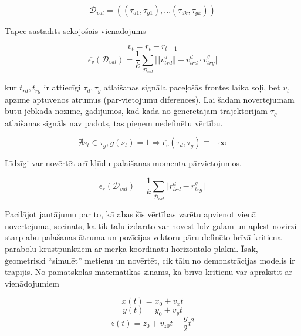 \documentclass[12pt, a4paper]{article}
\numberwithin{equation}{section} %
\begin{document}
\begin{equation}
    \mathcal{D}_{val} = \left (  (\tau_{d1}, \tau_{g1}), ...
     (\tau_{dk}, \tau_{gk}) \right )
\end{equation}

Tāpēc sastādīts sekojošais vienādojums

\begin{equation}
    v_t = r_t - r_{t-1}
\end{equation}
\begin{equation}
    \overline{\epsilon_v}(\mathcal{D}_{val}) = \frac{1}{k} \sum_{\mathcal{D}_{val}}
    \vert \Vert v^d_{trd} \Vert - v^d_{trd} \cdot v^g_{trg} \vert 
\end{equation}

kur $t_{rd}, t_{rg}$ ir attiecīgi $\tau_{d}, \tau_{g}$ atlaišanas signāla paceļošās frontes laika soļi, bet $v_t$ apzīmē aptuvenos ātrumus (pār-vietojumu diferences). Lai šādam novērtējumam būtu jebkāda nozīme, gadījumos, kad kādā no ģenerētajām trajektorijām $\tau_{g}$ atlaišanas signāls nav padots, tas pieņem nedefinētu vērtību.

\begin{equation}
    \nexists s_t \in \tau_{g}, g(s_t) = 1 
    \Rightarrow
    \overline{\epsilon_v}(\tau_{d},\tau_{g}) \equiv +\infty 
\end{equation}

Līdzīgi var novērtēt arī kļūdu palaišanas momenta pārvietojumos.

\begin{equation}
    \overline{\epsilon_r}(\mathcal{D}_{val}) = \frac{1}{k} \sum_{\mathcal{D}_{val}}
    \Vert r^d_{trd} - r^g_{trg} \Vert 
\end{equation}

Pacilājot jautājumu par to, kā abas šīs vērtības varētu apvienot vienā novērtējumā, secināts, ka tik tālu izdarīto var novest līdz galam un aplēst novirzi starp abu palašanas ātruma un pozīcijas vektoru pāru definēto brīvā kritiena parabolu krustpunktiem ar mērķa koordinātu horizontālo plakni. Īsāk, ģeometriski ``simulēt'' metienu un novērtēt, cik tālu no demonstrācijas modelis ir trāpījis. No pamatskolas matemātikas zināms, ka brīvo kritienu var aprakstīt ar vienādojumiem

\begin{equation}
    x(t) = x_0 + v_xt 
\end{equation}
\begin{equation}
    y(t) = y_0 + v_yt 
\end{equation}
\begin{equation}
    z(t) = z_0 + v_{z0}t - \frac{g}{2}t^2 
\end{equation}
\end{document}
